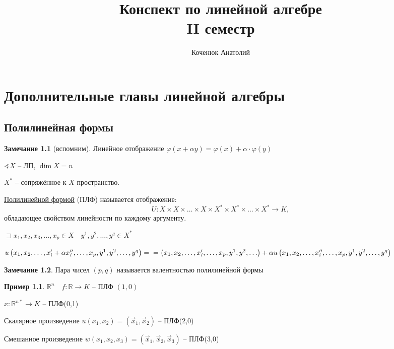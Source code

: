 \documentclass{book}
\author{Коченюк Анатолий}
\title{Конспект по линейной алгебре\\ II семестр}
\newcommand\R{\ensuremath{\mathbb{R}}}
\newcommand{\p}[1]{#1^{\prime}}
\newcommand{\pp}[1]{#1^{\prime\prime}}
\theoremstyle{definition}
\newtheorem*{note}{Замечание}
\newtheorem*{example}{Пример}
\begin{document}
    \maketitle
    \chapter{Дополнительные главы линейной алгебры}
    \section{Полилинейная формы}

    \begin{note}
        [вспомним]
        Линейное отображение $\varphi(x+\alpha y) = \varphi(x) + \alpha\cdot \varphi(y)$
    \end{note}

    \begin{definition}
        $\sphericalangle X$ -- ЛП, $\dim X = n$

         $X^*$ -- сопряжённое к  $X$ пространство.

         \underline{Полилинейной формой} (ПЛФ) называется отображение:
          \[
         U:X\times X\times \ldots \times X\times X^*\times X^*\times \ldots \times X^* \to K
         ,\] обладающее свойством линейности по каждому аргументу.

         $\sqsupset x_1, x_2, x_3, \ldots, x_p \in X\quad y^1, y^2, \ldots, y^q\in X^*$

         $u\left( x_1, x_2, \ldots,\p x_i+\alpha \pp x_i, \ldots, x_p, y^1, y^2, \ldots, y^q \right) =\\= \left(x_1, x_2, \ldots, \p x_i, \ldots, x_p, y^1, y^2, \ldots  \right) + \alpha u\left( x_1, x_2, \ldots, \pp x_i, \ldots, x_p, y^1, y^2, \ldots, y^q \right)  $
    \end{definition}

    \begin{note}
        Пара чисел $(p,q)$ называется валентностью полилинейной формы
    \end{note}

    \begin{example}
        $\R^n\quad f:\R\to K$ -- ПЛФ $(1,0)$

        $\hat x: \R^{n*} \to  K$ -- ПЛФ(0,1)

        Скалярное произведение $u(x_1, x_2) = \left( \vec x_1, \vec x_2 \right) $ -- ПЛФ(2,0)

        Смешанное произведение $w(x_1, x_2, x_3) = (\vec x_1, \vec x_2, \vec x_3)$ -- ПЛФ(3,0)
    \end{example}
\end{document}
